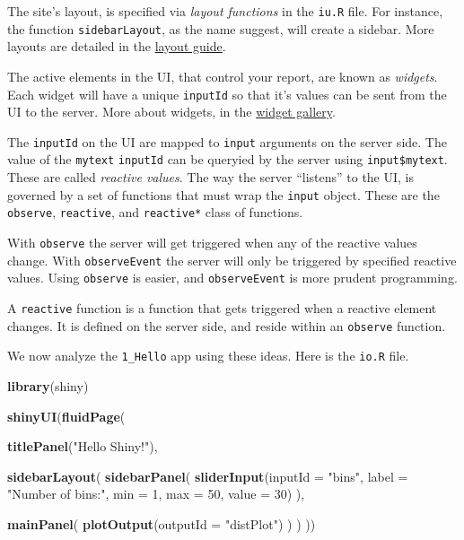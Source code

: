 \documentclass[]{book}
\newenvironment{Shaded}{\begin{snugshade}}{\end{snugshade}}
\newcommand{\KeywordTok}[1]{\textcolor[rgb]{0.13,0.29,0.53}{\textbf{{#1}}}}
\newcommand{\DataTypeTok}[1]{\textcolor[rgb]{0.13,0.29,0.53}{{#1}}}
\newcommand{\DecValTok}[1]{\textcolor[rgb]{0.00,0.00,0.81}{{#1}}}
\newcommand{\StringTok}[1]{\textcolor[rgb]{0.31,0.60,0.02}{{#1}}}
\newcommand{\NormalTok}[1]{{#1}}
\theoremstyle{definition}
\theoremstyle{definition}
\theoremstyle{remark}
\begin{document}
The site's layout, is specified via \emph{layout functions} in the
\texttt{iu.R} file. For instance, the function \texttt{sidebarLayout},
as the name suggest, will create a sidebar. More layouts are detailed in
the \href{http://shiny.rstudio.com/articles/layout-guide.html}{layout
guide}.

The active elements in the UI, that control your report, are known as
\emph{widgets}. Each widget will have a unique \texttt{inputId} so that
it's values can be sent from the UI to the server. More about widgets,
in the
\href{http://shiny.rstudio.com/gallery/widget-gallery.html}{widget
gallery}.

The \texttt{inputId} on the UI are mapped to \texttt{input} arguments on
the server side. The value of the \texttt{mytext} \texttt{inputId} can
be queryied by the server using \texttt{input\$mytext}. These are called
\emph{reactive values}. The way the server ``listens'' to the UI, is
governed by a set of functions that must wrap the \texttt{input} object.
These are the \texttt{observe}, \texttt{reactive}, and
\texttt{reactive*} class of functions.

With \texttt{observe} the server will get triggered when any of the
reactive values change. With \texttt{observeEvent} the server will only
be triggered by specified reactive values. Using \texttt{observe} is
easier, and \texttt{observeEvent} is more prudent programming.

A \texttt{reactive} function is a function that gets triggered when a
reactive element changes. It is defined on the server side, and reside
within an \texttt{observe} function.

We now analyze the \texttt{1\_Hello} app using these ideas. Here is the
\texttt{io.R} file.

\begin{Shaded}
\begin{Highlighting}[]
\KeywordTok{library}\NormalTok{(shiny)}

\KeywordTok{shinyUI}\NormalTok{(}\KeywordTok{fluidPage}\NormalTok{(}

  \KeywordTok{titlePanel}\NormalTok{(}\StringTok{"Hello Shiny!"}\NormalTok{),}

  \KeywordTok{sidebarLayout}\NormalTok{(}
    \KeywordTok{sidebarPanel}\NormalTok{(}
      \KeywordTok{sliderInput}\NormalTok{(}\DataTypeTok{inputId =} \StringTok{"bins"}\NormalTok{,}
                  \DataTypeTok{label =} \StringTok{"Number of bins:"}\NormalTok{, }
                  \DataTypeTok{min =} \DecValTok{1}\NormalTok{,}
                  \DataTypeTok{max =} \DecValTok{50}\NormalTok{,}
                  \DataTypeTok{value =} \DecValTok{30}\NormalTok{)}
    \NormalTok{),}

    \KeywordTok{mainPanel}\NormalTok{(}
      \KeywordTok{plotOutput}\NormalTok{(}\DataTypeTok{outputId =} \StringTok{"distPlot"}\NormalTok{)}
    \NormalTok{)}
  \NormalTok{)}
\NormalTok{))}
\end{Highlighting}
\end{Shaded}
\end{document}
